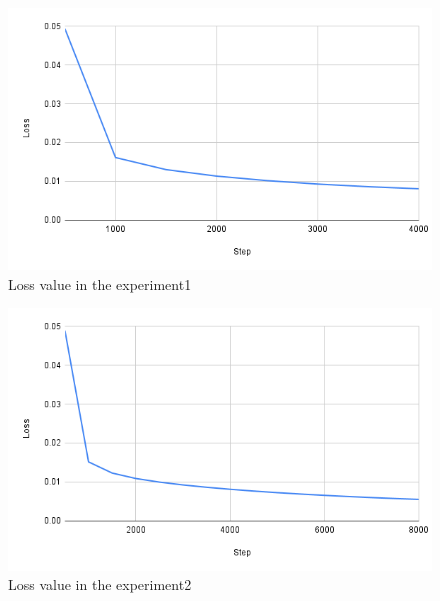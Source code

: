 

\newpage
\begin{figure}[h]
  \centering
  \includegraphics[keepaspectratio, scale=0.31]{images/exp1.2_4000.png}
  \caption{Loss value in the experiment1}
  \label{Fig:exp1.2_4000}
  \end{figure}
  
\begin{figure}[h]
  \centering
  \includegraphics[keepaspectratio, scale=0.31]{images/exp1.2_8000.png}
  \caption{Loss value in the experiment2}
  \label{Fig:exp1.2_8000}
  \end{figure}

